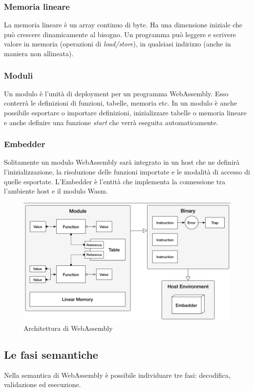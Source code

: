 \subsubsection{Memoria lineare}
La memoria lineare è un  array continuo di byte. Ha una dimensione iniziale che può crescere dinamicamente al bisogno. Un programma può leggere e scrivere valore in memoria (operazioni di \emph{load/store}), in qualsiasi indirizzo (anche in maniera non allineata).
\subsubsection{Moduli}
Un modulo è l'unità di deployment per un programma WebAssembly. Esso conterrà le definizioni di funzioni, tabelle, memoria etc. In un modulo è anche possibile esportare o importare definizioni, inizializzare tabelle o memoria lineare e anche definire una funzione \emph{start} che verrà eseguita automaticamente. 
\subsubsection{Embedder}
Solitamente un modulo WebAssembly sarà integrato in un host che ne definirà l'inizializzazione, la risoluzione delle funzioni importate  e le modalità di accesso di quelle esportate. L'Embedder è l'entità che implementa la connessione tra l'ambiente host e il modulo Wasm. 
\begin{figure}
        \begin{center}
                \includegraphics[width=0.9\columnwidth]{images/wasmArchitecture.png}
        \end{center}
        \caption{Architettura di WebAssembly}
        \label{fig:wasmArch}
\end{figure}

\newpage
\subsection{Le fasi semantiche}
Nella semantica di WebAssembly è possibile individuare tre fasi: decodifica, validazione ed esecuzione.
